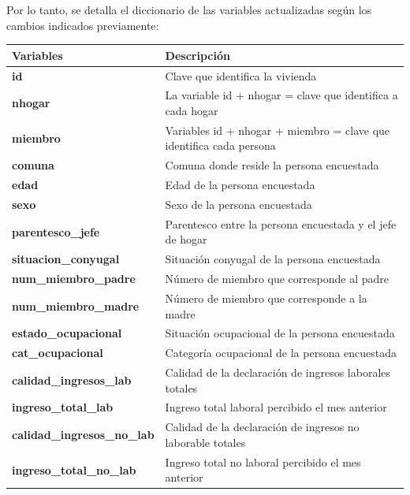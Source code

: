 \documentclass[a4paper]{article}
\begin{document}
    Por lo tanto, se detalla el diccionario de las variables actualizadas según los cambios indicados previamente:
    \begin{table}[H]
    \begin{tabular}{|l|l|}
        \hline
        \textbf{Variables}                     & \textbf{Descripción} \\ \hline
        \textbf{id}                            & Clave que identifica la vivienda \\ \hline
        \textbf{nhogar}                        & La variable id + nhogar = clave que identifica a cada hogar \\ \hline
        \textbf{miembro}                       & Variables id + nhogar + miembro = clave que identifica  cada persona \\ \hline
        \textbf{comuna}                        & Comuna donde reside la persona encuestada \\ \hline
        \textbf{edad}                          & Edad de la persona encuestada \\ \hline
        \textbf{sexo}                          & Sexo de la persona encuestada \\ \hline
        \textbf{parentesco\_jefe}              & Parentesco entre la persona encuestada y el jefe de hogar \\ \hline
        \textbf{situacion\_conyugal}           & Situación conyugal de la persona encuestada \\ \hline
        \textbf{num\_miembro\_padre}           & Número de miembro que corresponde al padre \\ \hline
        \textbf{num\_miembro\_madre}           & Número de miembro que corresponde a la madre \\ \hline
        \textbf{estado\_ocupacional}           & Situación ocupacional de la persona encuestada \\ \hline
        \textbf{cat\_ocupacional}              & Categoría ocupacional de la persona encuestada \\ \hline
        \textbf{calidad\_ingresos\_lab}        & Calidad de la declaración de ingresos laborales totales \\ \hline
        \textbf{ingreso\_total\_lab}           & Ingreso total laboral percibido el mes anterior \\ \hline
        \textbf{calidad\_ingresos\_no\_lab}    & Calidad de la declaración de ingresos no laborable totales \\ \hline
        \textbf{ingreso\_total\_no\_lab}       & Ingreso total no laboral percibido el mes anterior \\ \hline

\end{tabular}
\end{table}
\end{document}

